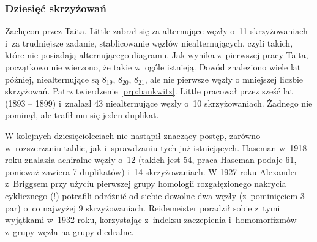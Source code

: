 
\subsubsection{Dziesięć skrzyżowań}
Zachęcon przez Taita, Little zabrał się za alternujące węzły o~11 skrzyżowaniach i~za trudniejsze zadanie, stablicowanie węzłów niealternujących, czyli takich, które nie posiadają alternującego diagramu.
Jak wynika z~pierwszej pracy Taita, początkowo nie wierzono, że takie w~ogóle istnieją.
Dowód znaleziono wiele lat później, niealternujące są $8_{19}$, $8_{20}$, $8_{21}$, ale nie pierwsze węzły o mniejszej liczbie skrzyżowań.
Patrz twierdzenie \ref{prp:bankwitz}.
Little pracował przez sześć lat (1893 -- 1899) i~znalazł 43 niealternujące węzły o~10 skrzyżowaniach.
Żadnego nie pominął, ale trafił mu się jeden duplikat.
%

W kolejnych dziesięcioleciach nie nastąpił znaczący postęp, zarówno w~rozszerzaniu tablic, jak i~sprawdzaniu tych już istniejących.
Haseman \cite{haseman18} w~1918 roku znalazła achiralne węzły o~12 (takich jest 54, praca Haseman podaje 61, ponieważ zawiera 7 duplikatów) i~14 skrzyżowaniach.
%
W 1927 roku Alexander z~Briggsem \cite{briggs27} przy użyciu pierwszej grupy homologii rozgałęzionego nakrycia cyklicznego (!) potrafili odróżnić od siebie dowolne dwa węzły (z~pominięciem 3 par) o~co najwyżej 9 skrzyżowaniach.
%
%
Reidemeister \cite{reidemeister32} poradził sobie z~tymi wyjątkami w~1932 roku, korzystając z~indeksu zaczepienia i~homomorfizmów z~grupy węzła na grupy diedralne.
%

